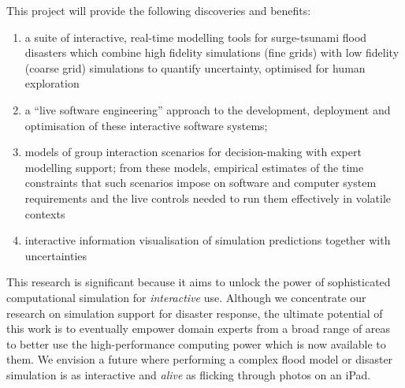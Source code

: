 \documentclass[a4paper,fontsize=12pt]{scrartcl}
\begin{document}
This project will provide the following discoveries and benefits:
\begin{enumerate}

\item a suite of interactive, real-time modelling tools for
  surge-tsunami flood disasters which combine high fidelity
  simulations (fine grids) with low fidelity (coarse grid) simulations
  to quantify uncertainty, optimised for human exploration

\item a ``live software engineering'' approach to the development,
  deployment and optimisation of these interactive software systems;

\item models of group interaction scenarios for decision-making with
  expert modelling support; from these models, empirical estimates of
  the time constraints that such scenarios impose on software
  and computer system requirements and the live controls needed to run
  them effectively in volatile contexts

\item interactive information visualisation of simulation predictions
together with uncertainties
 

\end{enumerate}

This research is significant because it aims to unlock the power of
sophisticated computational simulation for \emph{interactive} use.
Although we concentrate our research on simulation support for
disaster response, the ultimate potential of this work is to
eventually empower domain experts from a broad range of areas to
better use the high-performance computing power which is now available
to them. We envision a future where performing a complex flood model
or disaster simulation is as interactive and \emph{alive} as flicking
through photos on an iPad.
\end{document}
